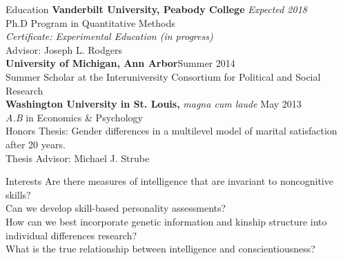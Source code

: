 \documentclass {resume}
\begin{document}
\nonfrenchspacing
\thispagestyle{myheadings}
\markright{\em{\textrm \today}}


\begin{rSection}{\textrm{Education}}
{\bf Vanderbilt University, Peabody College } \hfill  {\em Expected 2018} \\
Ph.D Program in Quantitative Methods %
\\
\hspace* {3 mm}\textit{Certificate: Experimental Education (in progress)}\\
\hspace* {3 mm}Advisor: Joseph L. Rodgers\medskip\\
\textbf{University of Michigan, Ann Arbor}\hfill Summer 2014\\ 
Summer Scholar at the Interuniversity Consortium for Political and Social Research\medskip\\
{\bf Washington University in St. Louis, }\textit{magna cum laude} \hfill  {May 2013} \\ 
{\em A.B} in Economics \& Psychology\\
\hspace* {3 mm}Honors Thesis: Gender differences in a multilevel model of marital satisfaction after 20 years.  \\
\hspace* {3 mm}Thesis Advisor: Michael J. Strube%
\end{rSection}
\begin{rSection}{\textrm{Interests}} 
Are there measures of intelligence that are invariant to noncognitive skills?\\
Can we develop skill-based personality assessments?\\
How can we best incorporate genetic information and kinship structure into individual differences research?\\
What is the true relationship between intelligence and conscientiousness?\end{rSection}
\end{document}
